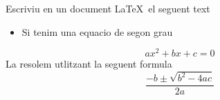 Escriviu en un document \LaTeX\ el seguent text 

\begin{itemize}
    \item {Si tenim una equacio de segon grau}
\end{itemize}
\begin{equation}
    ax^2 + bx + c = 0
\end{equation}
La resolem utlitzant la seguent formula
\begin{equation*}
    \frac{-b\pm \sqrt{b^2-4ac}}{2a}
\end{equation*}